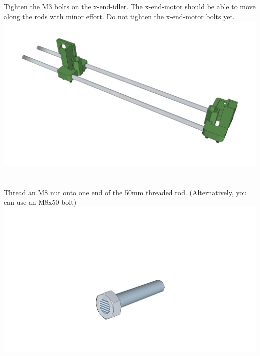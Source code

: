 \documentclass[twoside,openany,a4paper,titlepage]{memoir}
\begin{document}
	\section{}
	Tighten the M3 bolts on the x-end-idler. The x-end-motor should be able to move along the rods with
	minor effort. Do not tighten the x-end-motor bolts yet.\\
	\includegraphics[width=1\linewidth]{graphics/ch7_8.png}
	
	\section{}
	Thread an M8 nut onto one end of the 50mm threaded rod. (Alternatively, you can use an M8x50 bolt)
	\includegraphics[width=1\linewidth]{graphics/ch7_9.png}
	
\end{document}

